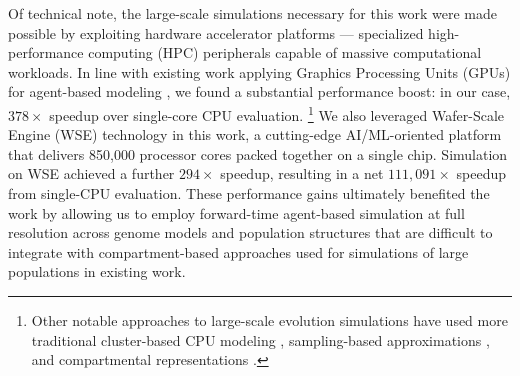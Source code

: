Of technical note, the large-scale simulations necessary for this work were made possible by exploiting hardware accelerator platforms --- specialized high-performance computing (HPC) peripherals capable of massive computational workloads.
In line with existing work applying Graphics Processing Units (GPUs) for agent-based modeling \citep{turpin2021xaevol,kosiachenko2019mass,perumalla2009switching,heinemann2007artificial,richmond2023flame}, we found a substantial performance boost: in our case, $378\times$ speedup over single-core CPU evaluation.
\footnote{%
Other notable approaches to large-scale evolution simulations have used more traditional cluster-based CPU modeling \citep{moreno2022best,collier2015large,ray1995proposal,turpin2020paevol}, sampling-based approximations \citep{taddei1997role}, and compartmental representations \citep{tenaillon1999mutators}.}
We also leveraged Wafer-Scale Engine (WSE) technology in this work, a cutting-edge AI/ML-oriented platform that delivers 850,000 processor cores packed together on a single chip.
Simulation on WSE achieved a further $294\times$ speedup, resulting in a net $111{,}091\times$ speedup from single-CPU evaluation.
These performance gains ultimately benefited the work by allowing us to employ forward-time agent-based simulation at full resolution across genome models and population structures that are difficult to integrate with compartment-based approaches used for simulations of large populations in existing work.
